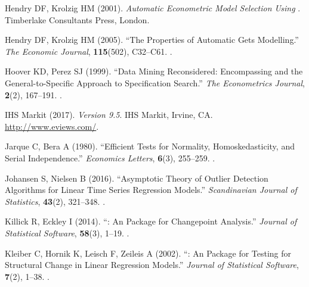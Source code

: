 \documentclass[article,nojss]{jss}
\begin{document}
\begin{thebibliography}{56}
	Hendry DF, Krolzig HM (2001).
	\newblock \emph{Automatic Econometric Model Selection Using }.
	\newblock Timberlake Consultants Press, London.
	
	Hendry DF, Krolzig HM (2005).
	\newblock \enquote{The Properties of Automatic Gets Modelling.}
	\newblock \emph{The Economic Journal}, \textbf{115}(502), C32--C61.
	\newblock {}.
	
	Hoover KD, Perez SJ (1999).
	\newblock \enquote{Data Mining Reconsidered: Encompassing and the
		General-to-Specific Approach to Specification Search.}
	\newblock \emph{The Econometrics Journal}, \textbf{2}(2), 167--191.
	\newblock {}.
	
	{IHS Markit} (2017).
	\newblock \emph{ Version 9.5}.
	\newblock IHS Markit, Irvine, CA.
	\newblock \urlprefix\url{http://www.eviews.com/}.
	
	Jarque C, Bera A (1980).
	\newblock \enquote{Efficient Tests for Normality, Homoskedasticity, and Serial
		Independence.}
	\newblock \emph{Economics Letters}, \textbf{6}(3), 255--259.
	\newblock {}.
	
	Johansen S, Nielsen B (2016).
	\newblock \enquote{Asymptotic Theory of Outlier Detection Algorithms for Linear
		Time Series Regression Models.}
	\newblock \emph{Scandinavian Journal of Statistics}, \textbf{43}(2), 321--348.
	\newblock {}.
	
	Killick R, Eckley I (2014).
	\newblock \enquote{: An  Package for Changepoint
		Analysis.}
	\newblock \emph{Journal of Statistical Software}, \textbf{58}(3), 1--19.
	\newblock {}.
	
	Kleiber C, Hornik K, Leisch F, Zeileis A (2002).
	\newblock \enquote{: An  Package for Testing for
		Structural Change in Linear Regression Models.}
	\newblock \emph{Journal of Statistical Software}, \textbf{7}(2), 1--38.
	\newblock {}.
	

\end{thebibliography}
\end{document}
